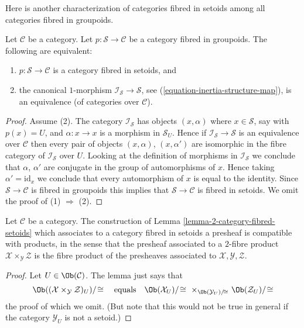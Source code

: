 \noindent
Here is another characterization of categories fibred in setoids
among all categories fibred in groupoids.

\begin{lemma}
\label{lemma-characterize-fibred-setoids-inertia}
Let $\mathcal{C}$ be a category.
Let $p : \mathcal{S} \to \mathcal{C}$ be a category fibred in groupoids.
The following are equivalent:
\begin{enumerate}
\item $p : \mathcal{S} \to \mathcal{C}$ is a category fibred in setoids, and
\item the canonical $1$-morphism $\mathcal{I}_\mathcal{S} \to \mathcal{S}$,
see (\ref{equation-inertia-structure-map}), is an equivalence (of categories
over $\mathcal{C}$).
\end{enumerate}
\end{lemma}

\begin{proof}
Assume (2). The category $\mathcal{I}_\mathcal{S}$ has objects
$(x, \alpha)$ where $x \in \mathcal{S}$, say with $p(x) = U$, and
$\alpha : x \to x$ is a morphism in $\mathcal{S}_U$. Hence if
$\mathcal{I}_\mathcal{S} \to \mathcal{S}$ is an equivalence over $\mathcal{C}$
then every pair of objects $(x, \alpha)$, $(x, \alpha')$ are isomorphic
in the fibre category of $\mathcal{I}_\mathcal{S}$ over $U$.
Looking at the definition of morphisms in $\mathcal{I}_\mathcal{S}$
we conclude that $\alpha$, $\alpha'$ are conjugate in the group
of automorphisms of $x$. Hence taking $\alpha' = \text{id}_x$ we conclude
that every automorphism of $x$ is equal to the identity.
Since $\mathcal{S} \to \mathcal{C}$ is fibred in groupoids this
implies that $\mathcal{S} \to \mathcal{C}$ is fibred in setoids.
We omit the proof of (1) $\Rightarrow$ (2).
\end{proof}

\begin{lemma}
\label{lemma-category-fibred-setoids-presheaves-products}
Let $\mathcal{C}$ be a category.
The construction of
Lemma \ref{lemma-2-category-fibred-setoids}
which associates to a category fibred in setoids a presheaf is
compatible with products, in the sense that the presheaf associated
to a $2$-fibre product $\mathcal{X} \times_\mathcal{Y} \mathcal{Z}$
is the fibre product of the presheaves associated to
$\mathcal{X}, \mathcal{Y}, \mathcal{Z}$.
\end{lemma}

\begin{proof}
Let $U \in \Ob(\mathcal{C})$. The lemma just says that
$$
\Ob((\mathcal{X} \times_\mathcal{Y} \mathcal{Z})_U)/\!\cong
\quad \text{equals} \quad
\Ob(\mathcal{X}_U)/\!\cong
\ \times_{\Ob(\mathcal{Y}_U)/\!\cong}
\ \Ob(\mathcal{Z}_U)/\!\cong
$$
the proof of which we omit. (But note that this would not be true
in general if the category $\mathcal{Y}_U$ is not a setoid.)
\end{proof}










